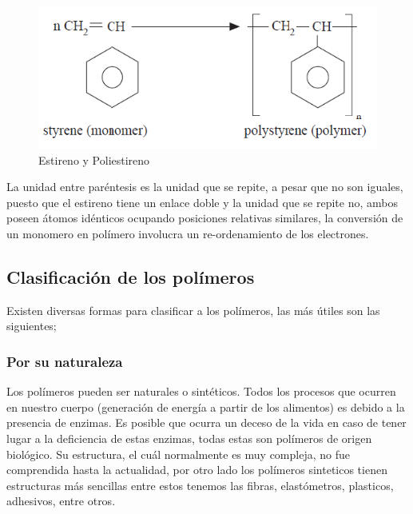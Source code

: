 \documentclass[a4paper, 11pt]{article}
\begin{document}
\begin{figure} 
\vspace{-1.2cm}
  \begin{center}
    \includegraphics[scale=0.4]{estireno.png}
	\vspace{-0.5cm}    
     \caption{Estireno y Poliestireno}
    \label{estireno}
  \end{center}
\end{figure} 
\noindent
La unidad entre paréntesis es la unidad que se repite, a pesar que no son iguales, puesto que el estireno tiene un enlace doble y la unidad que se repite no, ambos poseen átomos idénticos ocupando posiciones relativas similares, la conversión de un monomero en polímero involucra un re-ordenamiento de los electrones.
\subsection{Clasificación de los polímeros}
Existen diversas formas para clasificar a los polímeros, las más útiles son las siguientes;\\

\subsubsection{Por su naturaleza} Los polímeros pueden ser naturales o sintéticos. Todos los procesos que ocurren en nuestro cuerpo (generación de energía a partir de los alimentos) es debido a la presencia de enzimas. Es posible que ocurra un deceso de la vida en caso de tener lugar a la deficiencia de estas enzimas, todas estas son polímeros de origen biológico. Su estructura, el cuál normalmente es muy compleja, no fue comprendida hasta la actualidad, por otro lado los polímeros sinteticos tienen estructuras más sencillas entre estos tenemos las fibras, elastómetros, plasticos, adhesivos, entre otros.\\
\end{document}
